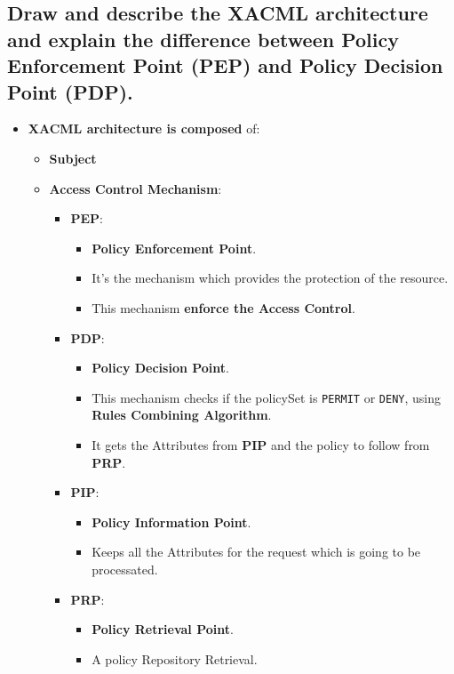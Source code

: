 \documentclass[9pt, letterpaper]{article}
\begin{document}
\newpage

\subsection{Draw and describe the XACML architecture and explain the difference between Policy Enforcement Point (PEP) and Policy Decision Point (PDP).}
\begin{itemize}
	\item \textbf{XACML architecture is composed} of:
	\begin{itemize}
		\item \textbf{Subject}
		\item \textbf{Access Control Mechanism}:
		\begin{itemize}
		\item \textbf{PEP}:
		\begin{itemize}
			\item \textbf{Policy Enforcement Point}.
			\item It's the mechanism which provides the protection of the resource. 
			\item This mechanism \textbf{enforce the Access Control}.
		\end{itemize}				
		 
		\item \textbf{PDP}: 
		\begin{itemize}
			\item \textbf{Policy Decision Point}.
			\item This mechanism checks if the policySet is {\tt PERMIT} or {\tt DENY}, using \textbf{Rules Combining Algorithm}. 
			\item It gets the Attributes from \textbf{PIP} and the policy to follow from \textbf{PRP}.
		\end{itemize}				
		
		\item \textbf{PIP}:
		\begin{itemize}
			\item \textbf{Policy Information Point}.
			\item Keeps all the Attributes for the request which is going to be processated.
		\end{itemize}				
		 
		\item \textbf{PRP}: 
		\begin{itemize}
			\item \textbf{Policy Retrieval Point}.
			\item A policy Repository Retrieval.
		\end{itemize}				
		

\end{itemize}
\end{itemize}
\end{itemize}
\end{document}
